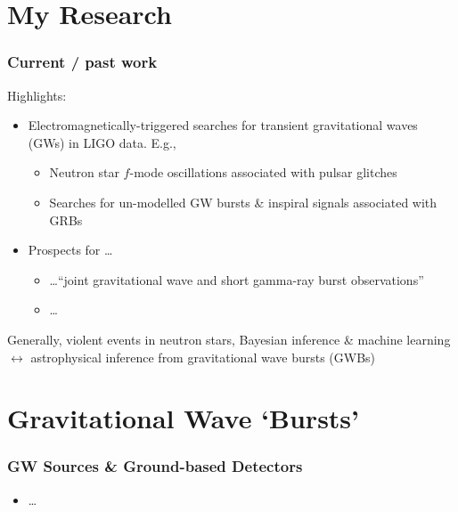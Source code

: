 \documentclass{beamer}
\def\gw#1{gravitational wave#1 (GW#1)\gdef\gw{GW}}
\def\gwb#1{gravitational wave burst#1 (GWB#1)\gdef\gw{GWB}}
\newcommand{\red}[1]{{\color{red}{#1}}}
\begin{document}
\section{My Research}
\begin{frame}
    \frametitle{Current / past work}
    Highlights:
    \begin{itemize}
        \item Electromagnetically-triggered searches for transient \gw{s} in LIGO data.
            E.g.,
            \begin{itemize}
                \item Neutron star $f$-mode oscillations associated with pulsar
                    glitches~\cite{s5velaglitch-paper}
                \item Searches for un-modelled GW bursts \& inspiral signals
                    associated with
                    GRBs~\cite{2012arXiv1201.4413T,0004-637X-760-1-12}
            \end{itemize}
        \item Prospects for \dots
            \begin{itemize}
                \item \dots ``joint gravitational wave and short gamma-ray burst
                    observations''~\cite{2014arXiv1409.8149C}
                \item \dots \red{``high frequency burst searches following binary
                    neutron star coalescence with advanced gravitational wave
                detectors''}~\cite{clark:14}
            \end{itemize}
    \end{itemize}

        Generally, violent events in neutron stars, Bayesian inference \&
    machine learning $\leftrightarrow$ astrophysical inference from \gwb{s}

\end{frame}

\section{Gravitational Wave `Bursts'}



\begin{frame}
    \frametitle{GW Sources \& Ground-based Detectors}
    \begin{itemize}
        \item \dots
    \end{itemize}
\end{frame}
\end{document}
